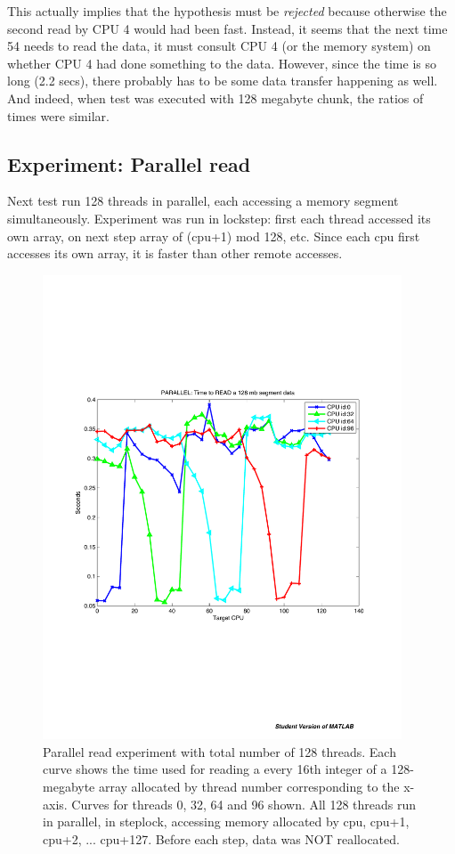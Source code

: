 \documentclass[12pt]{article}
\begin{document}
This actually implies that the hypothesis must be \emph{rejected} because otherwise the second read by CPU 4 would had
been fast. Instead, it seems that the next time 54 needs to read the data, it must consult CPU 4 (or the memory system) on whether
CPU 4 had done something to the data. However, since the time is so long (2.2 secs), there probably has to be some data
transfer happening as well. And indeed, when test was executed with 128 megabyte chunk, the ratios of times were similar.

\subsection{Experiment: Parallel read}

Next test run 128 threads in parallel, each accessing a memory segment simultaneously. Experiment was run in lockstep: first each thread accessed its own array, on next step array of (cpu+1) mod 128, etc. Since each cpu first accesses its own array, it is faster than other remote accesses. 

\begin{figure}[H]
\includegraphics[width=0.95\textwidth]{blacklight_par_access.pdf}
\caption{Parallel read experiment with total number of 128 threads. Each curve shows the time used for reading a every 16th integer of a 128-megabyte array allocated by thread number corresponding to the x-axis. Curves for threads 0, 32, 64 and 96 shown. All 128 threads run in parallel, in steplock, accessing memory allocated by cpu, cpu+1, cpu+2, ... cpu+127. Before each step, data was NOT reallocated.
}
\label{figseqpar}
\end{figure}
\end{document}
